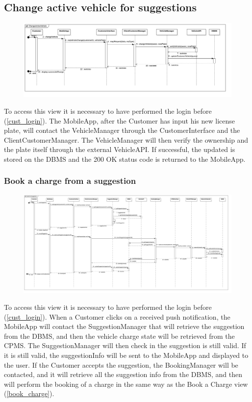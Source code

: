 \subsection{Change active vehicle for suggestions}
\begin{figure}[H]
    \begin{center}
        \includegraphics[width=\textwidth]{img/runtime/change_vehicle.png}
    \end{center}
\end{figure}
To access this view it is necessary to have performed the login before (\ref{cust_login}). The MobileApp, after the Customer has input his new license plate, will contact the VehicleManager through the CustomerInterface and the ClientCustomerManager. The VehicleManager will then verify the ownership and the plate itself through the external VehicleAPI. If successful, the updated is stored on the DBMS and the 200 OK status code is returned to the MobileApp.
\subsubsection{Book a charge from a suggestion}
\begin{figure}[H]
    \begin{center}
        \includegraphics[width=\textwidth]{img/runtime/suggestion.png}
    \end{center}
\end{figure}
To access this view it is necessary to have performed the login before (\ref{cust_login}). When a Customer clicks on a received push notification, the MobileApp will contact the SuggestionManager that will retrieve the suggestion from the DBMS, and then the vehicle charge state will be retrieved from the CPMS. The SuggestionManager will then check in the suggestion is still valid. If it is still valid, the suggestionInfo will be sent to the MobileApp and displayed to the user. If the Customer accepts the suggestion, the BookingManager will be contacted, and it will retrieve all the suggestion info from the DBMS, and then will perform the booking of a charge in the same way as the Book a Charge view (\ref{book_charge}).
